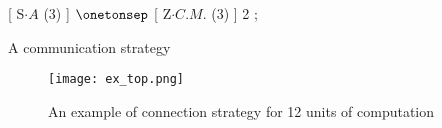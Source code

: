 \begin{algorithm}[H]
\dontprintsemicolon
\SetNoline
[ S$\cdot A$ (3) ] $\onetonsep$ [ Z$\cdot C.M.$ (3) ] 2 ;
\caption{A communication strategy}\label{algo:comm_str_ex}
\end{algorithm}

\begin{figure}[h]
	\centering	
	\texttt{[image: ex\_top.png]}
	\caption{An example of connection strategy for 12 units of computation}\label{fig:ex_conn}
\end{figure}